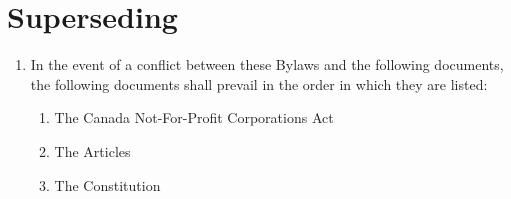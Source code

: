 \section{Superseding}
\label{superseding}

\begin{enumerate}
 \item In the event of a conflict between these Bylaws and the following documents, the following documents shall prevail in the order in which they are listed:
  \begin{enumerate}
   \item The Canada Not-For-Profit Corporations Act
   \item The Articles
   \item The Constitution
  \end{enumerate}
\end{enumerate}

